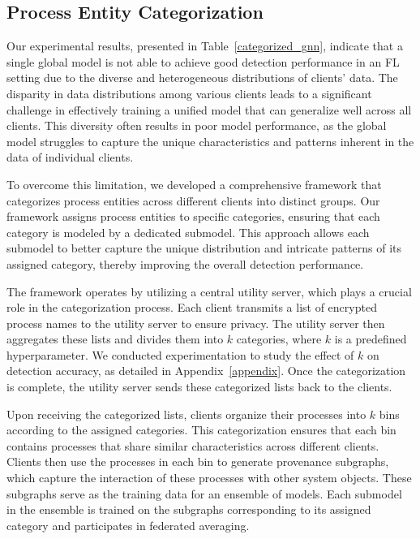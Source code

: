 \subsection{Process Entity Categorization}
\label{sys:catg}


Our experimental results, presented in Table~\ref{categorized_gnn}, indicate that a single global \gnnshort model is not able to achieve good detection performance in an FL setting due to the diverse and heterogeneous distributions of clients' data. The disparity in data distributions among various clients leads to a significant challenge in effectively training a unified model that can generalize well across all clients. This diversity often results in poor model performance, as the global model struggles to capture the unique characteristics and patterns inherent in the data of individual clients.

To overcome this limitation, we developed a comprehensive framework that categorizes process entities across different clients into distinct groups. Our framework assigns process entities to specific categories, ensuring that each category is modeled by a dedicated submodel. This approach allows each submodel to better capture the unique distribution and intricate patterns of its assigned category, thereby improving the overall detection performance.

The framework operates by utilizing a central utility server, which plays a crucial role in the categorization process. Each client transmits a list of encrypted process names to the utility server to ensure privacy. The utility server then aggregates these lists and divides them into \(k\) categories, where \(k\) is a predefined hyperparameter. We conducted experimentation to study the effect of \(k\) on detection accuracy, as detailed in Appendix~\ref{appendix}. Once the categorization is complete, the utility server sends these categorized lists back to the clients.

Upon receiving the categorized lists, clients organize their processes into \(k\) bins according to the assigned categories. This categorization ensures that each bin contains processes that share similar characteristics across different clients. Clients then use the processes in each bin to generate provenance subgraphs, which capture the interaction of these processes with other system objects. These subgraphs serve as the training data for an ensemble of \gnnshort models. Each submodel in the ensemble is trained on the subgraphs corresponding to its assigned category and participates in federated averaging.

